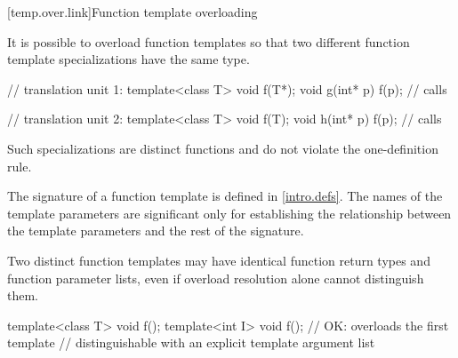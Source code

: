 [temp.over.link]{Function template overloading}

\pnum
{}%
It is possible to overload function templates so that two different
function template specializations have the same type.
\begin{example}

\begin{minipage}{.45\hsize}
\begin{codeblock}
// translation unit 1:
template<class T>
  void f(T*);
void g(int* p) {
  f(p); // calls 
}
\end{codeblock}
\end{minipage}
\begin{minipage}{.45\hsize}
\begin{codeblock}
// translation unit 2:
template<class T>
  void f(T);
void h(int* p) {
  f(p); // calls 
}
\end{codeblock}
\end{minipage}

\end{example}

\pnum
Such specializations are distinct functions and do not violate the one-definition
rule.

\pnum
The signature of a function template
is defined in \ref{intro.defs}.
The names of the template parameters are significant only for establishing
the relationship between the template parameters and the rest of the
signature.
\begin{note}
Two distinct function templates may have identical function return types and
function parameter lists, even if overload resolution alone cannot distinguish
them.

\begin{codeblock}
template<class T> void f();
template<int I> void f();       // OK: overloads the first template
                                // distinguishable with an explicit template argument list
\end{codeblock}
\end{note}

